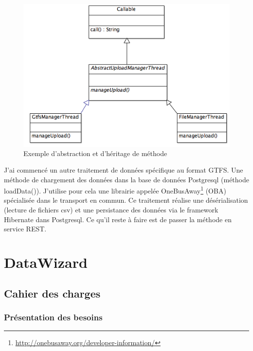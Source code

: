 \begin{itemize}
\begin{figure}[!h]
\centering
\includegraphics[width=14cm]{images/DiagrammeThread.png}
\caption{\label{UML1}Exemple d'abstraction et d'héritage de méthode}
\end{figure} 

J'ai commencé un autre traitement de données spécifique au format GTFS. Une méthode de chargement des données dans la base de données Postgresql (méthode loadData()). J'utilise pour cela une librairie appelée OneBusAway\footnote{\url{http://onebusaway.org/developer-information/}} (OBA) spécialisée dans le transport en commun. Ce traitement réalise une désérialisation (lecture de fichiers csv) et une persistance des données via le framework Hibernate dans Postgresql. Ce qu'il reste à faire est de passer la méthode en service REST.\\





\pagebreak

\section{DataWizard}\label{DataWizard}

\subsection{Cahier des charges}

\subsubsection{Présentation des besoins}


\end{itemize}
